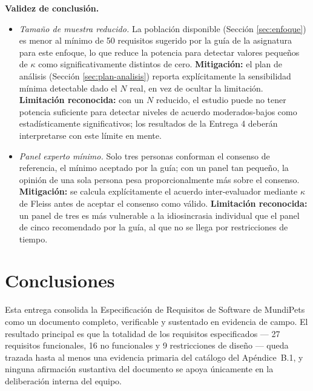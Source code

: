 \documentclass[journal,onecolumn]{IEEEtran}
\begin{document}
	\textbf{Validez de conclusión.}
	\begin{itemize}[leftmargin=*]
		\item \emph{Tamaño de muestra reducido.} La población disponible
		(Sección \ref{sec:enfoque}) es menor al mínimo de 50 requisitos
		sugerido por la guía de la asignatura para este enfoque, lo que
		reduce la potencia para detectar valores pequeños de $\kappa$ como
		significativamente distintos de cero. \textbf{Mitigación:} el plan
		de análisis (Sección \ref{sec:plan-analisis}) reporta explícitamente
		la sensibilidad mínima detectable dado el $N$ real, en vez de ocultar
		la limitación. \textbf{Limitación reconocida:} con un $N$ reducido,
		el estudio puede no tener potencia suficiente para detectar niveles
		de acuerdo moderados-bajos como estadísticamente significativos; los
		resultados de la Entrega 4 deberán interpretarse con este límite en
		mente.
		\item \emph{Panel experto mínimo.} Solo tres personas conforman el
		consenso de referencia, el mínimo aceptado por la guía; con un panel
		tan pequeño, la opinión de una sola persona pesa proporcionalmente
		más sobre el consenso. \textbf{Mitigación:} se calcula
		explícitamente el acuerdo inter-evaluador mediante $\kappa$ de Fleiss
		antes de aceptar el consenso como válido. \textbf{Limitación
			reconocida:} un panel de tres es más vulnerable a la idiosincrasia
		individual que el panel de cinco recomendado por la guía, al que no
		se llega por restricciones de tiempo.
	\end{itemize}
	
	
	\section{Conclusiones}
	\label{sec:conclusiones}
	
	Esta entrega consolida la Especificación de Requisitos de Software de
	MundiPets como un documento completo, verificable y sustentado en evidencia
	de campo. El resultado principal es que la totalidad de los requisitos
	especificados --- 27 requisitos funcionales, 16 no funcionales y 9
	restricciones de diseño --- queda trazada hasta al menos una evidencia
	primaria del catálogo del Apéndice~B.1, y ninguna afirmación sustantiva del
	documento se apoya únicamente en la deliberación interna del equipo.
	
\end{document}
